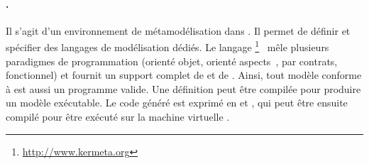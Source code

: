 \paragraph{\kermeta.} Il s'agit d'un environnement de métamodélisation dans
{\eclipse}. Il permet de définir et spécifier des langages de modélisation
dédiés. Le langage
{\kermeta}\footnote{\url{http://www.kermeta.org}}~\cite{kermeta10} mêle
plusieurs paradigmes de programmation (orienté objet, orienté
aspects~\cite{Muller2005,Muller2005a}, par contrats, fonctionnel) et fournit un
support complet de {\ecore} et de {\emof}. Ainsi, tout modèle {\kermeta}
conforme à {\emof} est aussi un programme {\kermeta} valide. Une définition
{\kermeta} peut être compilée pour produire un modèle exécutable. Le code
généré est exprimé en {\java} et {\scala}, qui peut être ensuite compilé pour
être exécuté sur la machine virtuelle {\java}.



     



